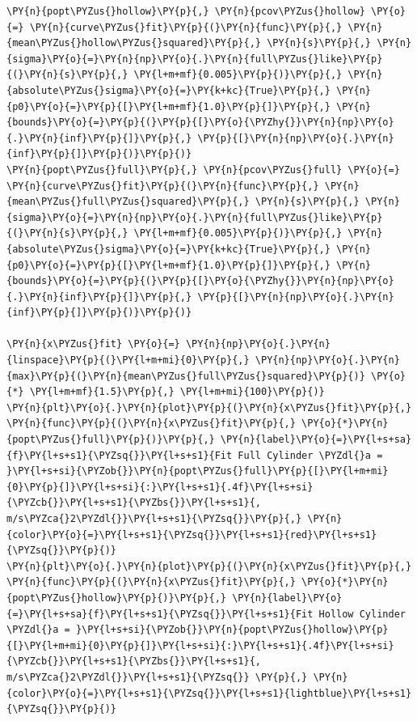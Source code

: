 \begin{tcolorbox}[breakable, size=fbox, boxrule=1pt, pad at break*=1mm,colback=cellbackground, colframe=cellborder]
\begin{Verbatim}[commandchars=\\\{\}]
\PY{n}{popt\PYZus{}hollow}\PY{p}{,} \PY{n}{pcov\PYZus{}hollow} \PY{o}{=} \PY{n}{curve\PYZus{}fit}\PY{p}{(}\PY{n}{func}\PY{p}{,} \PY{n}{mean\PYZus{}hollow\PYZus{}squared}\PY{p}{,} \PY{n}{s}\PY{p}{,} \PY{n}{sigma}\PY{o}{=}\PY{n}{np}\PY{o}{.}\PY{n}{full\PYZus{}like}\PY{p}{(}\PY{n}{s}\PY{p}{,} \PY{l+m+mf}{0.005}\PY{p}{)}\PY{p}{,} \PY{n}{absolute\PYZus{}sigma}\PY{o}{=}\PY{k+kc}{True}\PY{p}{,} \PY{n}{p0}\PY{o}{=}\PY{p}{[}\PY{l+m+mf}{1.0}\PY{p}{]}\PY{p}{,} \PY{n}{bounds}\PY{o}{=}\PY{p}{(}\PY{p}{[}\PY{o}{\PYZhy{}}\PY{n}{np}\PY{o}{.}\PY{n}{inf}\PY{p}{]}\PY{p}{,} \PY{p}{[}\PY{n}{np}\PY{o}{.}\PY{n}{inf}\PY{p}{]}\PY{p}{)}\PY{p}{)}
\PY{n}{popt\PYZus{}full}\PY{p}{,} \PY{n}{pcov\PYZus{}full} \PY{o}{=} \PY{n}{curve\PYZus{}fit}\PY{p}{(}\PY{n}{func}\PY{p}{,} \PY{n}{mean\PYZus{}full\PYZus{}squared}\PY{p}{,} \PY{n}{s}\PY{p}{,} \PY{n}{sigma}\PY{o}{=}\PY{n}{np}\PY{o}{.}\PY{n}{full\PYZus{}like}\PY{p}{(}\PY{n}{s}\PY{p}{,} \PY{l+m+mf}{0.005}\PY{p}{)}\PY{p}{,} \PY{n}{absolute\PYZus{}sigma}\PY{o}{=}\PY{k+kc}{True}\PY{p}{,} \PY{n}{p0}\PY{o}{=}\PY{p}{[}\PY{l+m+mf}{1.0}\PY{p}{]}\PY{p}{,} \PY{n}{bounds}\PY{o}{=}\PY{p}{(}\PY{p}{[}\PY{o}{\PYZhy{}}\PY{n}{np}\PY{o}{.}\PY{n}{inf}\PY{p}{]}\PY{p}{,} \PY{p}{[}\PY{n}{np}\PY{o}{.}\PY{n}{inf}\PY{p}{]}\PY{p}{)}\PY{p}{)}

\PY{n}{x\PYZus{}fit} \PY{o}{=} \PY{n}{np}\PY{o}{.}\PY{n}{linspace}\PY{p}{(}\PY{l+m+mi}{0}\PY{p}{,} \PY{n}{np}\PY{o}{.}\PY{n}{max}\PY{p}{(}\PY{n}{mean\PYZus{}full\PYZus{}squared}\PY{p}{)} \PY{o}{*} \PY{l+m+mf}{1.5}\PY{p}{,} \PY{l+m+mi}{100}\PY{p}{)}
\PY{n}{plt}\PY{o}{.}\PY{n}{plot}\PY{p}{(}\PY{n}{x\PYZus{}fit}\PY{p}{,} \PY{n}{func}\PY{p}{(}\PY{n}{x\PYZus{}fit}\PY{p}{,} \PY{o}{*}\PY{n}{popt\PYZus{}full}\PY{p}{)}\PY{p}{,} \PY{n}{label}\PY{o}{=}\PY{l+s+sa}{f}\PY{l+s+s1}{\PYZsq{}}\PY{l+s+s1}{Fit Full Cylinder \PYZdl{}a = }\PY{l+s+si}{\PYZob{}}\PY{n}{popt\PYZus{}full}\PY{p}{[}\PY{l+m+mi}{0}\PY{p}{]}\PY{l+s+si}{:}\PY{l+s+s1}{.4f}\PY{l+s+si}{\PYZcb{}}\PY{l+s+s1}{\PYZbs{}}\PY{l+s+s1}{, m/s\PYZca{}2\PYZdl{}}\PY{l+s+s1}{\PYZsq{}}\PY{p}{,} \PY{n}{color}\PY{o}{=}\PY{l+s+s1}{\PYZsq{}}\PY{l+s+s1}{red}\PY{l+s+s1}{\PYZsq{}}\PY{p}{)}
\PY{n}{plt}\PY{o}{.}\PY{n}{plot}\PY{p}{(}\PY{n}{x\PYZus{}fit}\PY{p}{,} \PY{n}{func}\PY{p}{(}\PY{n}{x\PYZus{}fit}\PY{p}{,} \PY{o}{*}\PY{n}{popt\PYZus{}hollow}\PY{p}{)}\PY{p}{,} \PY{n}{label}\PY{o}{=}\PY{l+s+sa}{f}\PY{l+s+s1}{\PYZsq{}}\PY{l+s+s1}{Fit Hollow Cylinder \PYZdl{}a = }\PY{l+s+si}{\PYZob{}}\PY{n}{popt\PYZus{}hollow}\PY{p}{[}\PY{l+m+mi}{0}\PY{p}{]}\PY{l+s+si}{:}\PY{l+s+s1}{.4f}\PY{l+s+si}{\PYZcb{}}\PY{l+s+s1}{\PYZbs{}}\PY{l+s+s1}{, m/s\PYZca{}2\PYZdl{}}\PY{l+s+s1}{\PYZsq{}} \PY{p}{,} \PY{n}{color}\PY{o}{=}\PY{l+s+s1}{\PYZsq{}}\PY{l+s+s1}{lightblue}\PY{l+s+s1}{\PYZsq{}}\PY{p}{)}


\end{Verbatim}
\end{tcolorbox}
